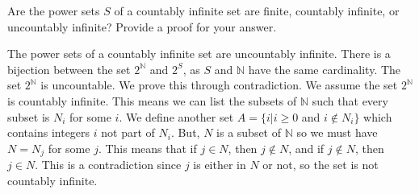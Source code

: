 \question Are the power sets $S$ of a countably infinite set are finite, countably infinite, or uncountably infinite? Provide a proof for your answer. 

\begin{solution} [2 mm]
The power sets of a countably infinite set are uncountably infinite. There is a bijection between the set $2^\mathbb{N}$ and $2^S$, as $S$ and $\mathbb{N}$ have the same cardinality. The set $2^\mathbb{N}$ is uncountable. We prove this through contradiction. We assume the set $2^\mathbb{N}$ is countably infinite. This means we can list the subsets of $\mathbb{N}$ such that every subset is $N_i$ for some $i$. We define another set $A = \{i | i \geq 0$ and $i \notin N_i\}$ which contains integers $i$ not part of $N_i$. But, $N$ is a subset of $\mathbb{N}$ so we must have $N = N_j$ for some $j$. This means that if $j \in N$, then $j \notin N$, and if $j \notin N$, then $j \in N$. This is a contradiction since $j$ is either in $N$ or not, so the set is not countably infinite.  
\end{solution}
